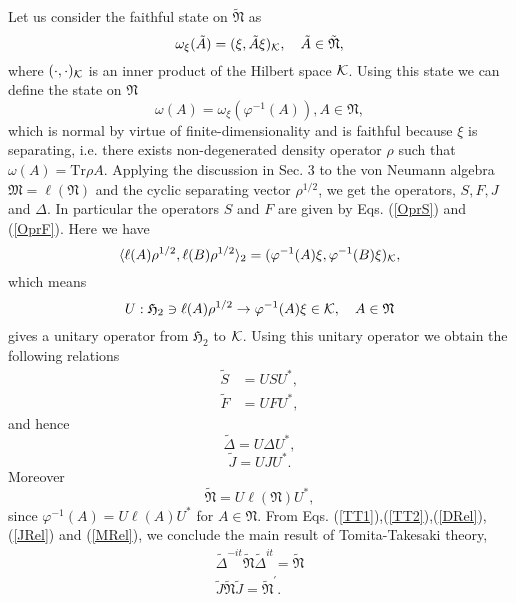 Let us consider the faithful state on $\tilde{\mathfrak{N}}$ as
$$
\omega_\xi(\tilde{A})=(\xi,\tilde{A}\xi)_{\cal K},\quad \tilde{A}\in \tilde{\mathfrak{N}},
$$
where $(\cdot,\cdot)_{\cal K}$ is an inner product of the Hilbert space ${\cal K}$.
Using this state we can define the state on $\mathfrak{N}$
$$
\omega(A)=\omega_\xi(\varphi^{-1}(A)),A\in \mathfrak{N},
$$
which is normal by virtue of finite-dimensionality and is faithful because $\xi$ is separating, i.e. there exists non-degenerated density operator $\rho$ such that $\omega(A)=\mbox{Tr}\rho A$.
Applying the discussion in Sec. 3 to the von Neumann algebra $\mathfrak{M}=\ell(\mathfrak{N})$ and 
the cyclic separating vector $\rho^{1/2}$, we get
the operators, $S, F, J$ and $\Delta$.
In particular the operators $S$ and $F$ are given by Eqs. (\ref{OprS}) and (\ref{OprF}).
Here we have
$$
\langle \ell(A)\rho^{1/2},\ell( B)\rho^{1/2}\rangle_2=(\varphi^{-1}(A)\xi,\varphi^{-1}(B)\xi)_{\cal K},
$$
which means
$$
U:\mathfrak{H}_2\ni\ell(A)\rho^{1/2}\to \varphi^{-1}(A)\xi\in {\cal K}, \quad A\in \mathfrak{N}
$$
gives a unitary operator from $\mathfrak{H}_2$ to ${\cal K}$.
Using this unitary operator we obtain the following relations
\begin{equation}
\begin{split}
\tilde{S}&=US U^{\ast},\\
\tilde{F}&=UFU^\ast ,
\end{split}
\end{equation}
and hence 
\begin{equation}\label{DRel}
\tilde{\Delta}=U\Delta U^\ast,
\end{equation}
\begin{equation}\label{JRel}
\tilde{J}=UJU^\ast.
\end{equation}
Moreover  
\begin{equation}\label{MRel}
\tilde{\mathfrak{N}}=U\ell(\mathfrak{N})U^\ast,
\end{equation}
since $\varphi^{-1}(A)=U\ell (A) U^\ast$ for $A\in \mathfrak{N}$.
From Eqs. (\ref{TT1}),(\ref{TT2}),(\ref{DRel}),(\ref{JRel}) and (\ref{MRel}), we conclude the main result of Tomita-Takesaki theory,
\begin{equation}
\begin{split}
\tilde{\Delta}^{-it}\tilde{\mathfrak{N}}\tilde{\Delta}^{it}=\tilde{\mathfrak{N}}\\
\tilde{J}\tilde{\mathfrak{N}}\tilde{J}=\tilde{\mathfrak{N}}^\prime.
\end{split}
\end{equation}



